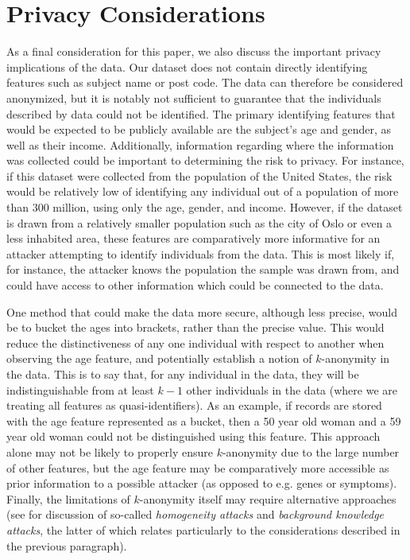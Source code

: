 \section{Privacy Considerations}
\label{sec:privacy}
As a final consideration for this paper, we also discuss the important privacy implications of the data. Our dataset does not contain directly identifying features such as subject name or post code. The data can therefore be considered anonymized, but it is notably not sufficient to guarantee that the individuals described by data could not be identified. The primary identifying features that would be expected to be publicly available are the subject’s age and gender, as well as their income. Additionally, information regarding where the information was collected could be important to determining the risk to privacy. For instance, if this dataset were collected from the population of the United States, the risk would be relatively low of identifying any individual out of a population of more than $300$ million, using only the age, gender, and income. However, if the dataset is drawn from a relatively smaller population such as the city of Oslo or even a less inhabited area, these features are comparatively more informative for an attacker attempting to identify individuals from the data. This is most likely if, for instance, the attacker knows the population the sample was drawn from, and could have access to other information which could be connected to the data.

One method that could make the data more secure, although less precise, would be to bucket the ages into brackets, rather than the precise value. This would reduce the distinctiveness of any one individual with respect to another when observing the age feature, and potentially establish a notion of $k$-anonymity in the data. \cite{sweeney2002k} This is to say that, for any individual in the data, they will be indistinguishable from at least $k-1$ other individuals in the data (where we are treating all features as quasi-identifiers). As an example, if records are stored with the age feature represented as a bucket, then a 50 year old woman and a 59 year old woman could not be distinguished using this feature. This approach alone may not be likely to properly ensure $k$-anonymity due to the large number of other features, but the age feature may be comparatively more accessible as prior information to a possible attacker (as opposed to e.g. genes or symptoms). Finally, the limitations of $k$-anonymity itself may require alternative approaches (see \citet{machanavajjhala2007diversity} for discussion of so-called \emph{homogeneity attacks} and \emph{background knowledge attacks}, the latter of which relates particularly to the considerations described in the previous paragraph).

